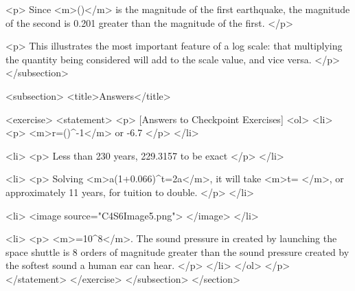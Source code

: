         <p>
            Since <m>\log()</m> is the magnitude of the first earthquake, the magnitude of the second is 0.201 greater than the magnitude of the first.
        </p>

        <p>
            This illustrates the most important feature of a log scale: that multiplying the quantity being considered will add to the scale value, and vice versa.
        </p>
    </subsection>


    <subsection>
        <title>Answers</title>

        <exercise>
            <statement>
                <p>
                    [Answers to Checkpoint Exercises]
                    <ol>
                        <li>
                            <p>
                                <m>r=()^{}-1</m> or -6.7%
                            </p>
                        </li>

                        <li>
                            <p>
                                Less than 230 years, 229.3157 to be exact
                            </p>
                        </li>

                        <li>
                            <p>
                                Solving <m>a(1+0.066)^{t}=2a</m>, it will take <m>t= </m>, or approximately 11 years, for tuition to double.
                            </p>
                        </li>

                        <li>
                            <image source="C4S6Image5.png">
                            </image>
                        </li>

                        <li>
                            <p>
                                <m>=10^{8}</m>. The sound pressure in created by launching the space shuttle is 8 orders of magnitude greater than the sound pressure created by the softest sound a human ear can hear.
                            </p>
                        </li>
                    </ol>
                </p>
            </statement>
        </exercise>
    </subsection>
</section>